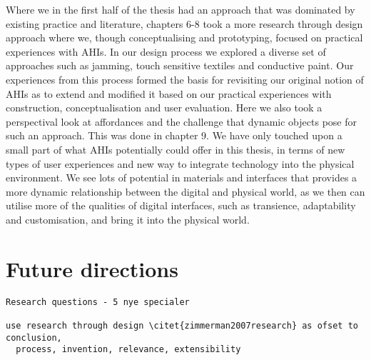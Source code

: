 Where we in the first half of the thesis had an approach that was dominated by existing practice and literature, chapters 6-8 took a more research through design approach where we, though conceptualising and prototyping, focused on practical experiences with AHIs.
In our design process we explored a diverse set of approaches such as jamming, touch sensitive textiles and conductive paint.
Our experiences from this process formed the basis for revisiting our original notion of AHIs as to extend and modified it based on our practical experiences with construction, conceptualisation and user evaluation.
Here we also took a perspectival look at affordances and the challenge that dynamic objects pose for such an approach.
This was done in chapter 9.
\blank
We have only touched upon a small part of what AHIs potentially could offer in this thesis, in terms of new types of user experiences and new way to integrate technology into the physical environment.
We see lots of potential in materials and interfaces that provides a more dynamic relationship between the digital and physical world, as we then can utilise more of the qualities of digital interfaces, such as transience, adaptability and customisation, and bring it into the physical world.

\section{Future directions}

\begin{verbatim}
Research questions - 5 nye specialer

use research through design \citet{zimmerman2007research} as ofset to conclusion,
  process, invention, relevance, extensibility 

\end{verbatim}


